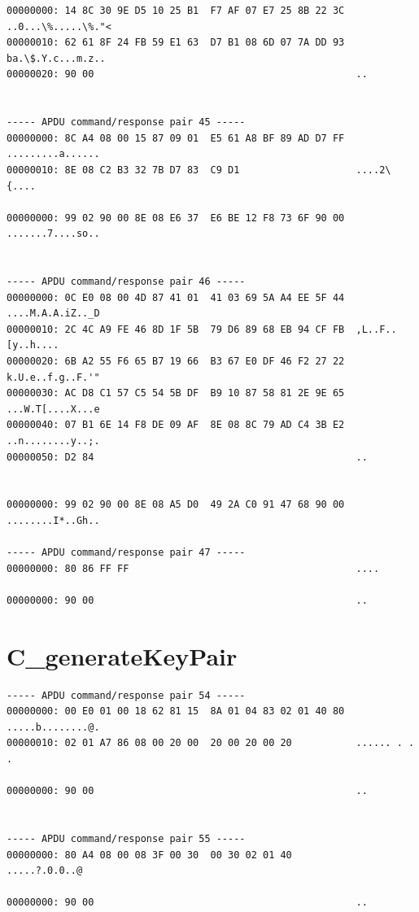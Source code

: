\documentclass[bsc,frontabs,twoside,singlespacing,parskip,deptreport]{infthesis}     %
\begin{document}
\begin{appendices}
\begin{Verbatim}[commandchars=\\\{\}, fontsize=\small]
00000000: 14 8C 30 9E D5 10 25 B1  F7 AF 07 E7 25 8B 22 3C  ..0...\%.....\%."<
00000010: 62 61 8F 24 FB 59 E1 63  D7 B1 08 6D 07 7A DD 93  ba.\$.Y.c...m.z..
00000020: 90 00                                             ..


----- APDU command/response pair 45 -----
00000000: 8C A4 08 00 15 87 09 01  E5 61 A8 BF 89 AD D7 FF  .........a......
00000010: 8E 08 C2 B3 32 7B D7 83  C9 D1                    ....2\{....

00000000: 99 02 90 00 8E 08 E6 37  E6 BE 12 F8 73 6F 90 00  .......7....so..


----- APDU command/response pair 46 -----
00000000: 0C E0 08 00 4D 87 41 01  41 03 69 5A A4 EE 5F 44  ....M.A.A.iZ.._D
00000010: 2C 4C A9 FE 46 8D 1F 5B  79 D6 89 68 EB 94 CF FB  ,L..F..[y..h....
00000020: 6B A2 55 F6 65 B7 19 66  B3 67 E0 DF 46 F2 27 22  k.U.e..f.g..F.'"
00000030: AC D8 C1 57 C5 54 5B DF  B9 10 87 58 81 2E 9E 65  ...W.T[....X...e
00000040: 07 B1 6E 14 F8 DE 09 AF  8E 08 8C 79 AD C4 3B E2  ..n........y..;.
00000050: D2 84                                             ..


00000000: 99 02 90 00 8E 08 A5 D0  49 2A C0 91 47 68 90 00  ........I*..Gh..

----- APDU command/response pair 47 -----
00000000: 80 86 FF FF                                       ....

00000000: 90 00                                             ..
\end{Verbatim}

\section{C\_generateKeyPair}
\begin{Verbatim}[commandchars=\\\{\}, fontsize=\small]
----- APDU command/response pair 54 -----
00000000: 00 E0 01 00 18 62 81 15  8A 01 04 83 02 01 40 80  .....b........@.
00000010: 02 01 A7 86 08 00 20 00  20 00 20 00 20           ...... . . . 

00000000: 90 00                                             ..


----- APDU command/response pair 55 -----
00000000: 80 A4 08 00 08 3F 00 30  00 30 02 01 40           .....?.0.0..@

00000000: 90 00                                             ..



\end{Verbatim}
\end{appendices}
\end{document}
